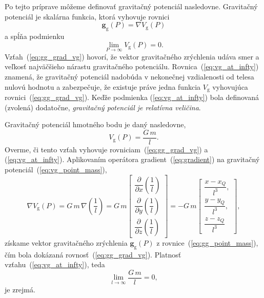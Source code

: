\documentclass[a4paper, 12pt]{book}
\newcommand{\gidx}{\mathrm g}
\let\vec\mathbf
\begin{document}
Po tejto príprave môžeme definovať gravitačný potenciál nasledovne.  Gravitačný 
potenciál je skalárna funkcia, ktorá vyhovuje rovnici 
\citep{SansoGeoidDetermination}
%
\begin{equation}
\label{eq:gg_grad_vg}
\vec g_\gidx(P) = \nabla V_\gidx(P)
\end{equation}
%
a spĺňa podmienku
%
\begin{equation}
\label{eq:vg_at_infty}
\lim_{P \to \infty} V_\gidx(P) = 0{.}
\end{equation}
%
Vzťah~(\ref{eq:gg_grad_vg}) hovorí, že vektor gravitačného zrýchlenia udáva 
smer a veľkosť najväčšieho nárastu gravitačného potenciálu.  
Rovnica~(\ref{eq:vg_at_infty}) znamená, že gravitačný potenciál nadobúda 
v nekonečnej vzdialenosti od telesa nulovú hodnotu a zabezpečuje, že existuje 
práve jedna funkcia $V_\gidx$ vyhovujúca rovnici~(\ref{eq:gg_grad_vg}).  Keďže 
podmienka (\ref{eq:vg_at_infty}) bola definovaná (zvolená) dodatočne, 
\emph{gravitačný potenciál je relatívna veličina}.

Gravitačný potenciál hmotného bodu je daný nasledovne,
%
\begin{equation}
\label{eq:vg_point_mass}
V_\gidx(P) = \frac{G \, m}{l}{.}
\end{equation}
%
Overme, či tento vzťah vyhovuje rovniciam~(\ref{eq:gg_grad_vg}) 
a (\ref{eq:vg_at_infty}).  Aplikovaním operátora gradient~(\ref{eq:gradient}) 
na gravitačný potenciál~(\ref{eq:vg_point_mass}),
%
\begin{equation}
\label{eq:gg_from_vg_point_mass}
\nabla V_\gidx(P) = G \, m \, \nabla \left( \frac{1}{l} \right) =
%
G \, m
\begin{bmatrix}
\dfrac{\partial}{\partial x} \left( \dfrac{1}{l} \right)\\[2ex]
\dfrac{\partial}{\partial y} \left( \dfrac{1}{l} \right)\\[2ex]
\dfrac{\partial}{\partial z} \left( \dfrac{1}{l} \right)
\end{bmatrix}
%
=
%
-G \, m
%
\begin{bmatrix}
\dfrac{x - x_Q}{l^3}{,}\\[2ex]
\dfrac{y - y_Q}{l^3}{,}\\[2ex]
\dfrac{z - z_Q}{l^3}
\end{bmatrix}
{,}
\end{equation}
%
získame vektor gravitačného zrýchlenia $\vec g_\gidx(P)$ 
z rovnice~(\ref{eq:gg_point_mass}), čím bola dokázaná 
rovnosť~(\ref{eq:gg_grad_vg}).  Platnosť vzťahu~(\ref{eq:vg_at_infty}), teda
%
\begin{equation}
\lim_{l \to \infty} \frac{G \, m}{l} = 0{,}
\end{equation}
%
je zrejmá.
\end{document}

